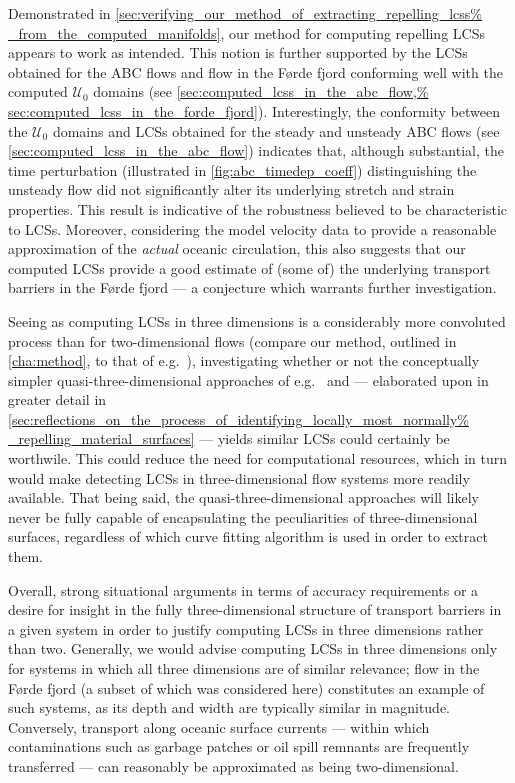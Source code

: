 Demonstrated in \cref{sec:verifying_our_method_of_extracting_repelling_lcss%
_from_the_computed_manifolds}, our method for computing repelling LCSs appears
to work as intended. This notion is further supported by the LCSs obtained for
the ABC flows and flow in the Førde fjord conforming well with the computed
$\mathcal{U}_{0}$ domains (see \cref{sec:computed_lcss_in_the_abc_flow,%
sec:computed_lcss_in_the_forde_fjord}). Interestingly, the conformity between
the $\mathcal{U}_{0}$ domains and LCSs obtained for the steady and unsteady ABC
flows (see \cref{sec:computed_lcss_in_the_abc_flow}) indicates that,
although substantial, the time perturbation (illustrated in
\cref{fig:abc_timedep_coeff}) distinguishing the unsteady flow did not
significantly alter its underlying stretch and strain properties. This result
is indicative of the robustness believed to be characteristic to LCSs.
Moreover, considering the model velocity data to provide a reasonable
approximation of the \emph{actual} oceanic circulation, this also suggests that
our computed LCSs provide a good estimate of (some of) the underlying transport
barriers in the Førde fjord --- a conjecture which warrants further
investigation.

Seeing as computing LCSs in three dimensions is a considerably more convoluted
process than for two-dimensional flows (compare our method, outlined in
\cref{cha:method}, to that of e.g.\ \textcite{loken2017sensitivity}),
investigating whether or not the conceptually simpler quasi-three-dimensional
approaches of e.g.\ \textcite{blazevski2014hyperbolic} and
\textcite{oettinger2016autonomous} --- elaborated upon in
greater detail in
\cref{sec:reflections_on_the_process_of_identifying_locally_most_normally%
_repelling_material_surfaces} --- yields similar LCSs could certainly be
worthwile. This could reduce the need for computational resources, which in
turn would make detecting LCSs in three-dimensional flow systems more readily
available. That being said, the quasi-three-dimensional approaches will likely
never be fully capable of encapsulating the peculiarities of three-dimensional
surfaces, regardless of which curve fitting algorithm is used in order to
extract them.

Overall, strong situational arguments in terms of accuracy requirements or a
desire for insight in the fully three-dimensional structure of transport
barriers in a given system in order to justify computing LCSs in three
dimensions rather than two. Generally, we would advise computing LCSs in three
dimensions only for systems in which all three dimensions are of similar
relevance; flow in the Førde fjord (a subset of which was considered here)
constitutes an example of such systems, as its depth and width are typically
similar in magnitude. Conversely, transport along oceanic surface currents ---
within which contaminations such as garbage patches or oil spill remnants are
frequently transferred --- can reasonably be approximated as being
two-dimensional.

